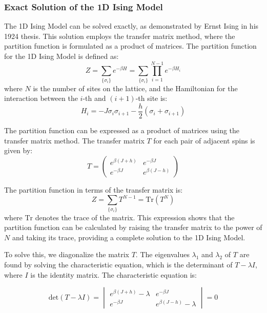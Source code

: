 \subsubsection{Exact Solution of the 1D Ising Model}
The 1D Ising Model can be solved exactly, as demonstrated by Ernst Ising in his
1924 thesis. This solution employs the transfer matrix method, where the
partition function is formulated as a product of matrices. The partition
function for the 1D Ising Model is defined as:
\begin{equation}
  \label{eq:partition1d}
  Z = \sum_{\{\sigma_i\}} e^{-\beta H} = \sum_{\{\sigma_i\}} \prod_{i=1}^{N-1} e^{-\beta H_i}
\end{equation}
where \( N \) is the number of sites on the lattice, and the Hamiltonian for the
interaction between the \( i \)-th and \( (i+1) \)-th site is:
\begin{equation}
  \label{eq:hamiltonian1d}
  H_i = -J \sigma_i \sigma_{i+1} - \frac{h}{2} (\sigma_i + \sigma_{i+1})
\end{equation}

The partition function can be expressed as a product of matrices using the
transfer matrix method. The transfer matrix \( T \) for each pair of adjacent
spins is given by:
\begin{equation}
  \label{eq:transfer1d}
  T = \begin{pmatrix}
    e^{\beta(J+h)} & e^{-\beta J} \\
    e^{-\beta J} & e^{\beta(J-h)}
  \end{pmatrix}
\end{equation}

The partition function in terms of the transfer matrix is:
\begin{equation}
  \label{eq:partition1dmat2}
  Z = \sum_{\{\sigma_i\}} T^{N-1} = \text{Tr}(T^N)
\end{equation}
where \( \text{Tr} \) denotes the trace of the matrix. This expression shows
that the partition function can be calculated by raising the transfer matrix to
the power of \( N \) and taking its trace, providing a complete solution to the
1D Ising Model.

To solve this, we diagonalize the matrix \( T \). The eigenvalues \( \lambda_1
\) and \( \lambda_2 \) of \( T \) are found by solving the characteristic
equation, which is the determinant of \( T - \lambda I \), where \( I \) is the
identity matrix. The characteristic equation is:

\begin{equation}
\text{det}(T - \lambda I) = \begin{vmatrix}
    e^{\beta(J+h)} - \lambda & e^{-\beta J} \\
    e^{-\beta J} & e^{\beta(J-h)} - \lambda
\end{vmatrix} = 0
\end{equation}

